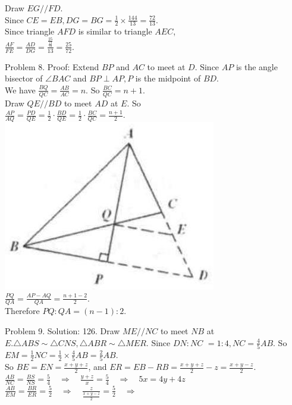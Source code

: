 \documentclass[10pt]{article}
\begin{document}
Draw \(E G / / F D\).\\
Since \(C E=E B, D G=B G=\frac{1}{2} \times \frac{144}{13}=\frac{72}{13}\).\\
Since triangle \(A F D\) is similar to triangle \(A E C\),\\
\(\frac{A F}{F E}=\frac{A D}{D G}=\frac{\frac{25}{\frac{13}{72}}}{13}=\frac{25}{72}\).

Problem 8. Proof:
Extend \(B P\) and \(A C\) to meet at \(D\). Since \(A P\) is the angle bisector of \(\angle B A C\) and \(B P \perp A P, P\) is the midpoint of \(B D\).\\
We have \(\frac{B Q}{Q C}=\frac{A B}{A C}=n\). So \(\frac{B C}{Q C}=n+1\).\\
Draw \(Q E / / B D\) to meet \(A D\) at \(E\). So\\
\(\frac{A P}{A Q}=\frac{P D}{Q E}=\frac{1}{2} \cdot \frac{B D}{Q E}=\frac{1}{2} \cdot \frac{B C}{Q C}=\frac{n+1}{2}\).\\
\includegraphics[max width=\textwidth, center]{2025_04_17_97bc1f7e44d93c271a88g-134(1)}\\
\(\frac{P Q}{Q A}=\frac{A P-A Q}{Q A}=\frac{n+1-2}{2}\).\\
Therefore \(P Q: Q A=(n-1): 2\).


Problem 9. Solution: 126.
Draw \(M E / / N C\) to meet \(N B\) at \(E . \triangle A B S \sim \triangle C N S, \triangle A B R \sim \triangle M E R\). Since \(D N: N C\) \(=1: 4, N C=\frac{4}{5} A B\). So \(E M=\frac{1}{2} N C=\frac{1}{2} \times \frac{4}{5} A B=\frac{2}{5} A B\).\\
So \(B E=E N=\frac{x+y+z}{2}\), and \(E R=E B-R B=\frac{x+y+z}{2}-z=\frac{x+y-z}{2}\).\\
\(\frac{A B}{N C}=\frac{B S}{N S}=\frac{5}{4} \quad \Rightarrow \quad \frac{y+z}{x}=\frac{5}{4} \quad \Rightarrow \quad 5 x=4 y+4 z\)\\
\(\frac{A B}{E M}=\frac{B R}{E R}=\frac{5}{2} \quad \Rightarrow \quad \frac{z}{\frac{x+y-z}{2}}=\frac{5}{2} \quad \Rightarrow\)
\end{document}
